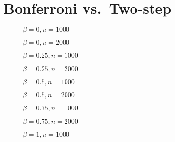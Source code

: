 \section{Bonferroni vs.\ Two-step}
\begin{figure}
  \centering
  
  \caption{$\beta = 0, n = 1000$}
\end{figure}

\begin{figure}
  \centering
  
  \caption{$\beta = 0, n = 2000$}
\end{figure}

\begin{figure}
  \centering
  
  \caption{$\beta = 0.25, n = 1000$}
\end{figure}

\begin{figure}
  \centering
  
  \caption{$\beta = 0.25, n = 2000$}
\end{figure}

\begin{figure}
  \centering
  
  \caption{$\beta = 0.5, n = 1000$}
\end{figure}

\begin{figure}
  \centering
  
  \caption{$\beta = 0.5, n = 2000$}
\end{figure}

\begin{figure}
  \centering
  
  \caption{$\beta = 0.75, n = 1000$}
\end{figure}

\begin{figure}
  \centering
  
  \caption{$\beta = 0.75, n = 2000$}
\end{figure}

\begin{figure}
  \centering
  
  \caption{$\beta = 1, n = 1000$}
\end{figure}

